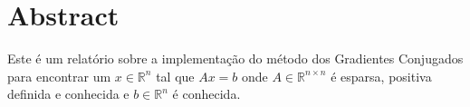 \documentclass[
10pt, %
a4paper, %
oneside, %
headinclude,footinclude, %
BCOR5mm, %
]{scrartcl}
\title{\normalfont\spacedallcaps{Método dos Gradientes Conjugados}} %
\subtitle{\normalfont\spacedallcaps{EP2 - MAC0300}}
\author{\spacedlowsmallcaps{Victor Sena Molero (8941317)}} %
\begin{document}

\renewcommand{\sectionmark}[1]{\markright{\spacedlowsmallcaps{#1}}} %
\lehead{\mbox{\llap{\small\thepage\kern1em\color{halfgray} \vline}\color{halfgray}\hspace{0.5em}\rightmark\hfil}} %

\pagestyle{scrheadings} %


\maketitle %

\setcounter{tocdepth}{2} %

\tableofcontents %



\section*{Abstract} %

Este é um relatório sobre a implementação do método dos Gradientes Conjugados para encontrar um $x \in \mathbb{R}^n$ tal que $Ax = b$ onde $A \in \mathbb{R}^{n \times n}$ é esparsa, positiva definida e conhecida e $b \in \mathbb{R}^n$ é conhecida.
\end{document}
